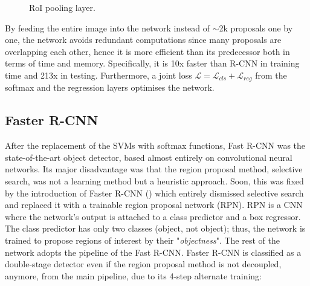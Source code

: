 \begin{figure}[!htb]
  \centering
  \caption{RoI pooling layer.}
  \label{fig4}
\end{figure}

By feeding the entire image into the network instead of $\sim$2k proposals one by one, the network avoids redundant computations since many proposals are overlapping each other, hence it is more efficient than its predecessor both in terms of time and memory. Specifically, it is 10x faster than R-CNN in training time and 213x in testing. Furthermore, a joint loss $\mathcal{L}=\mathcal{L}_{cls}+\mathcal{L}_{reg}$ from the softmax and the regression layers optimises the network.

\subsection{Faster R-CNN}
After the replacement of the SVMs with softmax functions, Fast R-CNN was the state-of-the-art object detector, based almost entirely on convolutional neural networks. Its major disadvantage was that the region proposal method, selective search, was not a learning method but a heuristic approach. Soon, this was fixed by the introduction of Faster R-CNN (\cite{ren2015faster}) which entirely dismissed selective search and replaced it with a trainable region proposal network (RPN). RPN is a CNN where the network's output is attached to a class predictor and a box regressor. The class predictor has only two classes (object, not object); thus, the network is trained to propose regions of interest by their "\textit{objectness}". The rest of the network adopts the pipeline of the Fast R-CNN. Faster R-CNN is classified as a double-stage detector even if the region proposal method is not decoupled, anymore, from the main pipeline, due to its 4-step alternate training:
 
